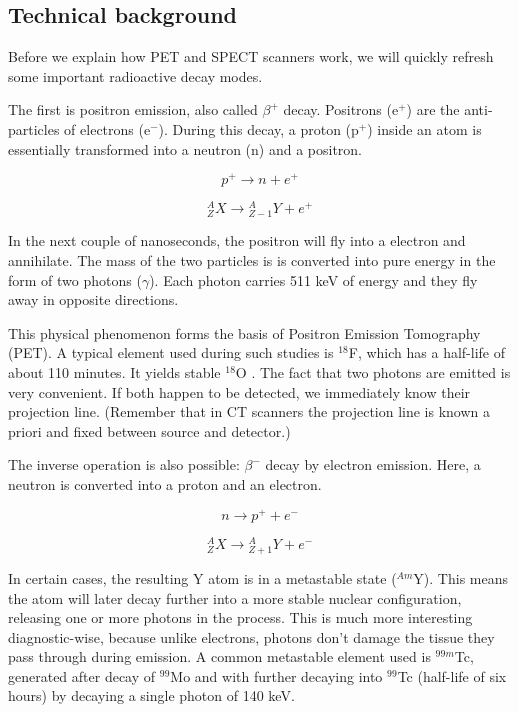 \subsection{Technical background}
Before we explain how PET and SPECT scanners work, we will quickly refresh some
important radioactive decay modes.

The first is positron emission, also called $\beta^+$ decay. Positrons (e$^+$)
are the anti-particles of electrons (e$^-$). During this decay, a proton (p$^+$)
inside an atom is essentially transformed into a neutron (n) and a positron.

\begin{equation}
	p^+ \rightarrow n + e^+
\end{equation}

\begin{equation}
	{}_Z^AX \rightarrow {}_{Z-1}^AY + e^+
\end{equation}

In the next couple of nanoseconds, the positron will fly into a electron and
annihilate. The mass of the two particles is is converted into pure energy in
the form of two photons ($\gamma$). Each photon carries 511 keV of energy and
they fly away in opposite directions.

This physical phenomenon forms the basis of Positron Emission Tomography (PET).
A typical element used during such studies is $^{18}$F, which has a half-life of
about 110 minutes. It yields stable $^{18}$O \cite{suetens}. The fact that two
photons are emitted is very convenient. If both happen to be detected, we
immediately know their projection line. (Remember that in CT scanners the
projection line is known a priori and fixed between source and detector.)

The inverse operation is also possible: $\beta^-$ decay by electron emission.
Here, a neutron is converted into a proton and an electron.

\begin{equation}
	n \rightarrow p^+ + e^-
\end{equation}

\begin{equation}
	{}_Z^AX \rightarrow {}_{Z+1}^AY + e^-
\end{equation}

In certain cases, the resulting Y atom is in a metastable state ($^{Am}$Y).
This means the atom will later decay further into a more stable nuclear
configuration, releasing one or more photons in the process. This is much more
interesting diagnostic-wise, because unlike electrons, photons don't damage the
tissue they pass through during emission. A common metastable element
used is $^{99m}$Tc, generated after decay of $^{99}$Mo and with further decaying
into $^{99}$Tc (half-life of six hours) by decaying a single photon of 140 keV.


